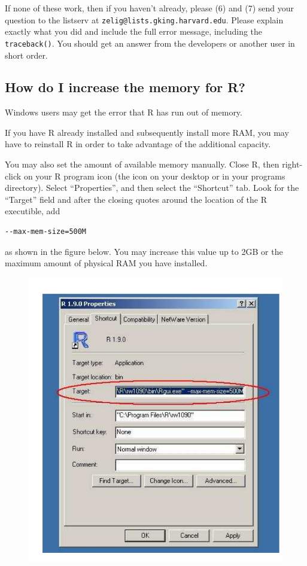 If none of these work, then if you haven't already, please (6)
 and
(7) send your question to the listserv at
\texttt{zelig@lists.gking.harvard.edu}.  Please explain exactly what you did
and include the full error message, including the {\tt traceback()}.
You should get an answer from the developers or another user in short
order.

\subsection*{How do I increase the memory for R?}

Windows users may get the error that R has run out of memory.  

If you have R already installed and subsequently install more RAM, you
may have to reinstall R in order to take advantage of the additional
capacity.

You may also set the amount of available memory manually.  Close R,
then right-click on your R program icon (the icon on your desktop or
in your programs directory). Select ``Properties'', and then select
the ``Shortcut'' tab.  Look for the ``Target'' field and after the
closing quotes around the location of the R executible, add
\begin{verbatim}
--max-mem-size=500M
\end{verbatim}
as shown in the figure below.  You may increase this value up to 2GB
or the maximum amount of physical RAM you have installed.

\begin{figure}[h!]
\begin{center}
\includegraphics{figs/increase}
\end{center}
\end{figure}

